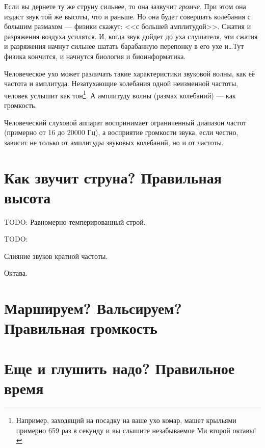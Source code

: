 Если вы дернете ту же струну сильнее, то она зазвучит \emph{громче}. При этом она издаст звук той же высоты, что и раньше. Но она будет совершать колебания с большим размахом --- физики скажут: <<с большей амплитудой>>. Сжатия и разряжения воздуха усилятся. И, когда звук дойдет до уха слушателя, эти сжатия и разряжения начнут сильнее шатать барабанную перепонку в его ухе и\ldots Тут физика кончится, и начнутся биология и биоинформатика.

Человеческое ухо может различать такие характеристики звуковой волны, как её частота и амплитуда. Незатухающие колебания одной неизменной частоты, человек услышит как тон\footnote{Например, заходящий на посадку на ваше ухо комар, машет крыльями примерно 659 раз в секунду и вы слышите незабываемое Ми второй октавы!}. А амплитуду волны (размах колебаний) --- как громкость. 

Человеческий слуховой аппарат воспринимает ограниченный диапазон частот (примерно от 16 до 20000 Гц), а восприятие громкости звука, если честно, зависит не только от амплитуды звуковых колебаний, но и от частоты. 


\section{Как звучит струна? Правильная высота}
\label{ch:music:tone}

TODO: Равномерно-темперированный строй.

TODO:
% 
% 


Слияние звуков кратной частоты.

Октава.

\section{Маршируем? Вальсируем? Правильная громкость}
\label{ch:music:volume}


\section{Еще и глушить надо? Правильное время}
\label{ch:music:rythm}




